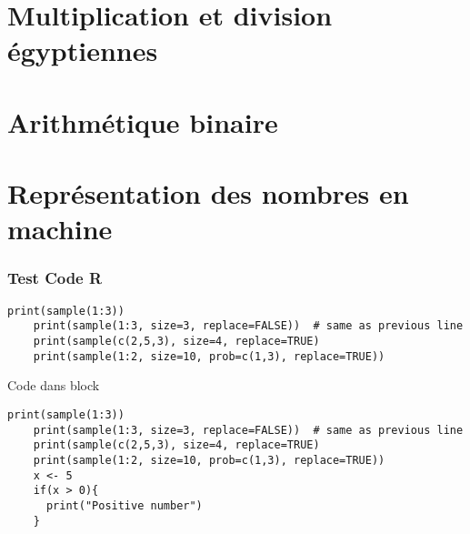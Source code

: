 \documentclass[10pt]{beamer}
\begin{document}
\section{Multiplication et division égyptiennes}



\section{Arithmétique binaire}



\section{Représentation des nombres en machine}





\begin{frame}[fragile]
  \frametitle{Test Code R}
  \begin{lstlisting}[caption={My Caption}]
    print(sample(1:3))
    print(sample(1:3, size=3, replace=FALSE))  # same as previous line
    print(sample(c(2,5,3), size=4, replace=TRUE)
    print(sample(1:2, size=10, prob=c(1,3), replace=TRUE))    
  \end{lstlisting}


  \begin{exampleblock}{Code dans block}
      \begin{lstlisting}
print(sample(1:3))
    print(sample(1:3, size=3, replace=FALSE))  # same as previous line
    print(sample(c(2,5,3), size=4, replace=TRUE)
    print(sample(1:2, size=10, prob=c(1,3), replace=TRUE))
    x <- 5
    if(x > 0){
      print("Positive number")
    }
  \end{lstlisting}
  \end{exampleblock}
\end{frame}


 \questionSlide

 \appendix
 \backupSlides

\end{document}
